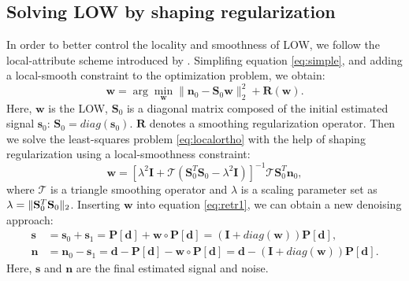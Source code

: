 \subsection{Solving LOW by shaping regularization}
In order to better control the locality and smoothness of LOW, we follow the local-attribute scheme introduced by \cite{fomel2007localattr}. Simplifing equation \ref{eq:simple}, and adding a local-smooth constraint to the optimization problem, we obtain: %
\begin{equation}
\label{eq:localortho}
\mathbf{w} = \arg\min_{\mathbf{w}} \parallel \mathbf{n}_0 - \mathbf{S}_0\mathbf{w}\parallel_2^2 + \mathbf{R}(\mathbf{w}). %
\end{equation}
Here, $\mathbf{w}$ is the LOW, $\mathbf{S}_0$ is a diagonal matrix composed of the initial estimated signal $\mathbf{s}_0$: $\mathbf{S}_0=diag(\mathbf{s}_0)$. $\mathbf{R}$ denotes a smoothing regularization operator.
Then we solve the least-squares problem \ref{eq:localortho} with the help of shaping regularization \cite[]{fomel2007shape} using a local-smoothness constraint:
\begin{equation}
\label{eq:shape}
\mathbf{w} = [\lambda^2\mathbf{I} + \mathcal{T}(\mathbf{S}_0^T\mathbf{S}_0-\lambda^2\mathbf{I})]^{-1}\mathcal{T}\mathbf{S}_0^T\mathbf{n}_0,
\end{equation}
where $\mathcal{T}$ is a triangle smoothing operator and $\lambda$ is a scaling parameter set as $\lambda  = \Arrowvert\mathbf{S}_0^T\mathbf{S}_0\Arrowvert_2$.
Inserting $\mathbf{w}$ into equation \ref{eq:retr1}, we can obtain a new denoising approach:
\begin{align}
\label{eq:news}
\mathbf{s}&=\mathbf{s}_0+\mathbf{s}_1=\mathbf{P}[\mathbf{d}]+\mathbf{w}\circ\mathbf{P}[\mathbf{d}]=(\mathbf{I}+diag(\mathbf{w}))\mathbf{P}[\mathbf{d}],\\
\label{eq:newn}
\mathbf{n}&=\mathbf{n}_0-\mathbf{s}_1=\mathbf{d}-\mathbf{P}[\mathbf{d}]-\mathbf{w}\circ\mathbf{P}[\mathbf{d}]=\mathbf{d}-(\mathbf{I}+diag(\mathbf{w}))\mathbf{P}[\mathbf{d}].
\end{align}
Here, $\mathbf{s}$ and $\mathbf{n}$ are the final estimated signal and noise.



